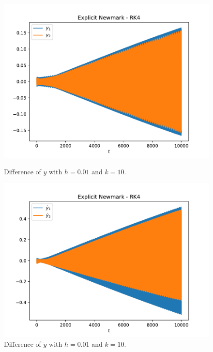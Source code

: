 \documentclass{report}
\begin{document}
\begin{figure}[h]
\centering
\begin{minipage}[t]{0.45\textwidth}
\centering
\includegraphics[width=\textwidth]{../Plots/Diff_Proj3/Real/New-RK4_k=1E1_t=1E5_y}
\caption{Difference of $y$ with $h=0.01$ and $k=10$.}
\label{pl:new_rk4_k=10}
\end{minipage}
\hfill	
\begin{minipage}[t]{0.45\textwidth}
\centering
\includegraphics[width=\textwidth]{../Plots/Diff_Proj3/Real/New-RK4_k=1E1_t=1E5_ydot}
\caption{Difference of $\dot{y}$ with $h=0.01$ and $k=10$.}\label{pl:new_rk4_k=10_dot}
\end{minipage}
\end{figure}
\end{document}
